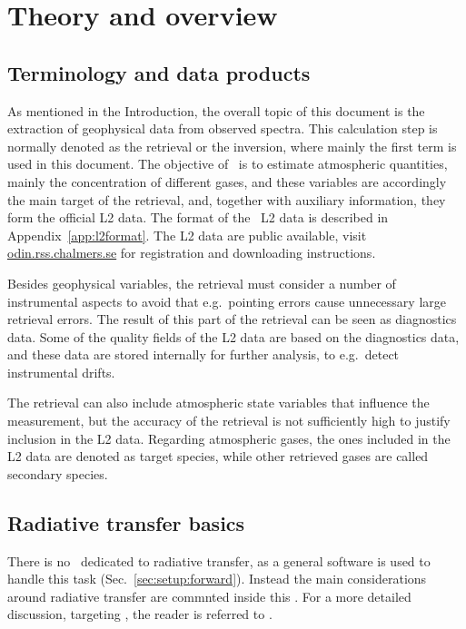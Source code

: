 \chapter{Theory and overview}
\label{chapter:overview}


\section{Terminology and data products}
\label{sec:terminology}
%
As mentioned in the Introduction, the overall topic of this document is the
extraction of geophysical data from observed spectra. This calculation step is
normally denoted as the retrieval or the inversion, where mainly the first term
is used in this document. The objective of \smr\ is to estimate atmospheric
quantities, mainly the concentration of different gases, and these variables
are accordingly the main target of the retrieval, and, together with auxiliary
information, they form the official L2 data. The format of the \smr\ L2 data is
described in Appendix~\ref{app:l2format}. The L2 data are public available,
visit \url{odin.rss.chalmers.se} for registration and downloading instructions.

Besides geophysical variables, the retrieval must consider a number of
instrumental aspects to avoid that e.g.\ pointing errors cause unnecessary
large retrieval errors. The result of this part of the retrieval can be seen as
diagnostics data. Some of the quality fields of the L2 data are based on the
diagnostics data, and these data are stored internally for further analysis, to
e.g.\ detect instrumental drifts. 

The retrieval can also include atmospheric state variables that influence the
measurement, but the accuracy of the retrieval is not sufficiently high to
justify inclusion in the L2 data. Regarding atmospheric gases, the ones
included in the L2 data are denoted as target species, while other retrieved
gases are called secondary species.



\section{Radiative transfer basics}
\label{sec:rt}
%
There is no \ATBD\ dedicated to radiative transfer, as a general software is used
to handle this task (Sec.~\ref{sec:setup:forward}). Instead the main
considerations around radiative transfer are commnted inside this \ATBD. For a
more detailed discussion, targeting \smr, the reader is referred to
\citet{eriksson:studi:02}.

